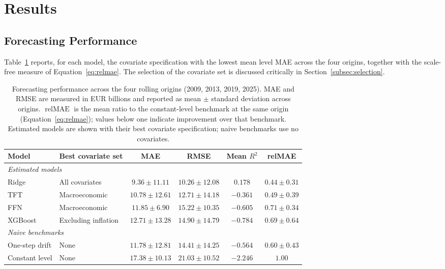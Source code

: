 \documentclass[11pt,a4paper]{article}
\begin{document}
\section{Results}
\label{sec:results}

\subsection{Forecasting Performance}

Table~\ref{tab:overall_results} reports, for each model, the covariate
specification with the lowest mean level MAE across the four origins, together
with the scale-free measure of Equation~\eqref{eq:relmae}. The selection of
the covariate set is discussed critically in Section~\ref{subsec:selection}.

\begin{table}[htbp]
\centering
\small
\caption{Forecasting performance across the four rolling origins (2009, 2013,
2019, 2025). MAE and RMSE are measured in EUR billions and reported as mean
$\pm$ standard deviation across origins. $\operatorname{relMAE}$ is the mean
ratio to the constant-level benchmark at the same origin
(Equation~\eqref{eq:relmae}); values below one indicate improvement over that
benchmark. Estimated models are shown with their best covariate
specification; naive benchmarks use no covariates.}
\label{tab:overall_results}
\begin{tabularx}{\textwidth}{l X c c c c}
\toprule
Model & Best covariate set & MAE & RMSE & Mean $R^2$ & relMAE \\
\midrule
\multicolumn{6}{l}{\textit{Estimated models}}\\[2pt]
Ridge
& All covariates
& $9.36 \pm 11.11$
& $10.26 \pm 12.08$
& $0.178$
& $0.44 \pm 0.31$ \\

TFT
& Macroeconomic
& $10.78 \pm 12.61$
& $12.71 \pm 14.18$
& $-0.361$
& $0.49 \pm 0.39$ \\

FFN
& Macroeconomic
& $11.85 \pm 6.90$
& $15.22 \pm 10.35$
& $-0.605$
& $0.71 \pm 0.34$ \\

XGBoost
& Excluding inflation
& $12.71 \pm 13.28$
& $14.90 \pm 14.79$
& $-0.784$
& $0.69 \pm 0.64$ \\
\midrule
\multicolumn{6}{l}{\textit{Naive benchmarks}}\\[2pt]
One-step drift
& None
& $11.78 \pm 12.81$
& $14.41 \pm 14.25$
& $-0.564$
& $0.60 \pm 0.43$ \\

Constant level
& None
& $17.38 \pm 10.13$
& $21.03 \pm 10.52$
& $-2.246$
& $1.00$ \\
\bottomrule
\end{tabularx}
\end{table}
\end{document}
